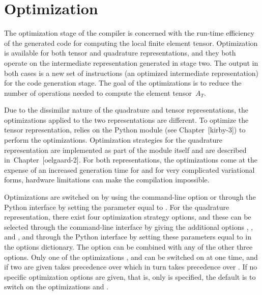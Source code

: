 \section{Optimization}

The optimization stage of the \ffc{} compiler is concerned with the
run-time efficiency of the generated code for computing the local finite
element tensor. Optimization is available for both tensor and
quadrature representations, and they both operate on the intermediate
representation generated in stage two. The output in both cases is a
new set of instructions (an optimized intermediate representation) for
the code generation stage. The goal of the optimizations is
to reduce the number of operations needed to compute the element
tensor~$A_T$.

Due to the dissimilar nature of the quadrature and tensor representations,
the optimizations applied to the two representations are different.
To optimize the tensor representation,
\ffc{} relies on the Python module \ferari{} (see Chapter~[kirby-3])
to perform the optimizations. Optimization strategies for the quadrature
representation are implemented as part of the
\ffc{} module itself and are described in~Chapter~[oelgaard-2].
For both representations, the optimizations come at the expense of an
increased generation time for \ffc{} and for very complicated
variational forms, hardware limitations can make the compilation
impossible.

Optimizations are switched on by using the command-line
option  or through the Python interface by setting the
parameter  equal to . For the quadrature
representation, there exist four optimization strategy options,
and these can be selected through the command-line interface by giving
the additional options , ,
 and ,
and through the Python interface by setting these
parameters equal to  in the options dictionary.
The option  can be combined with
any of the other three options.
Only one of the optimizations ,
 and  can be
switched on at one time, and if two are given 
takes precedence over  which in turn takes
precedence over .
If no specific optimization options are given, that is,
only  is specified, the default is to switch on the
optimizations  and
.

